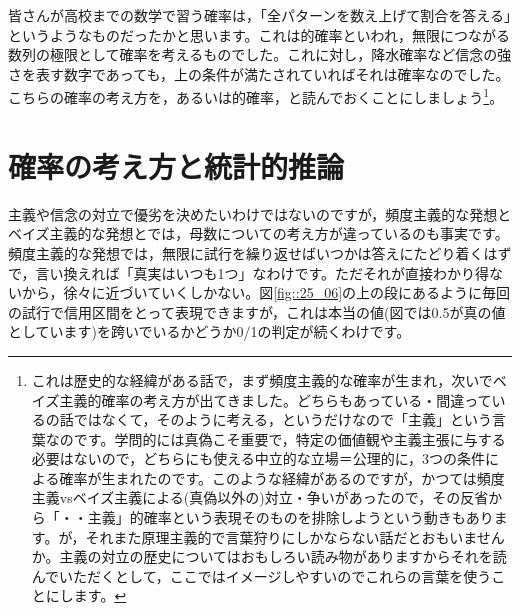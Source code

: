 \documentclass{ltjsarticle}
\begin{document}
皆さんが高校までの数学で習う確率は，「全パターンを数え上げて割合を答える」というようなものだったかと思います。これは的確率といわれ，無限につながる数列の極限として確率を考えるものでした。これに対し，降水確率など信念の強さを表す数字であっても，上の条件が満たされていればそれは確率なのでした。こちらの確率の考え方を，あるいは的確率，と読んでおくことにしましょう\footnote{これは歴史的な経緯がある話で，まず頻度主義的な確率が生まれ，次いでベイズ主義的確率の考え方が出てきました。どちらもあっている・間違っているの話ではなくて，そのように考える，というだけなので「主義」という言葉なのです。学問的には真偽こそ重要で，特定の価値観や主義主張に与する必要はないので，どちらにも使える中立的な立場＝公理的に，3つの条件による確率が生まれたのです。このような経緯があるのですが，かつては頻度主義vsベイズ主義による(真偽以外の)対立・争いがあったので，その反省から「・・主義」的確率という表現そのものを排除しようという動きもあります。が，それまた原理主義的で言葉狩りにしかならない話だとおもいませんか。主義の対立の歴史についてはおもしろい読み物がありますからそれ\parencite{mcgrayne2011theory}を読んでいただくとして，ここではイメージしやすいのでこれらの言葉を使うことにします。}。


\section{確率の考え方と統計的推論}


主義や信念の対立で優劣を決めたいわけではないのですが，頻度主義的な発想とベイズ主義的な発想とでは，母数についての考え方が違っているのも事実です。頻度主義的な発想では，無限に試行を繰り返せばいつかは答えにたどり着くはずで，言い換えれば「真実はいつも1つ」なわけです。ただそれが直接わかり得ないから，徐々に近づいていくしかない。図\ref{fig::25_06}の上の段にあるように毎回の試行で信用区間をとって表現できますが，これは本当の値(図では0.5が真の値としています)を跨いでいるかどうか0/1の判定が続くわけです。
\end{document}
